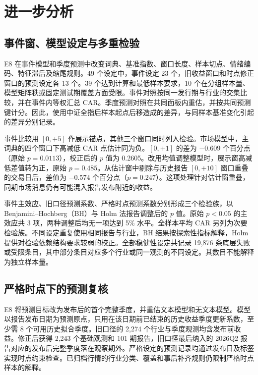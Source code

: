 \section{进一步分析}\label{sec:further}

\subsection{事件窗、模型设定与多重检验}

E8 在事件模型和季度预测中改变词典、基准指数、窗口长度、样本切点、情绪编码、特征滞后及缩尾规则。49 个设定中，事件设定 23 个，旧收益窗口和时点修正窗口的预测设定各 13 个。39 个达到计算和最低样本要求，10 个在分组样本量、模型矩阵秩或固定测试期覆盖方面受限。事件对照按同一发行期与行业的交集比较，并在事件内等权汇总 CAR。季度预测对照在共同面板内重估，并按共同预测键计分。因此，使用中证全指后样本起点后移造成的差异，与同样本基准变化引起的差异分别记录。

事件比较用 $[0,+5]$ 作展示锚点，其他三个窗口同时列入检验。市场模型中，主词典的四个窗口下高减低 CAR 点估计同为负。$[0,+1]$ 的差为 $-0.609$ 个百分点（原始 $p=0.0113$），校正后的 $p$ 值为 0.2605。改用均值调整模型时，展示窗高减低差值转为正，原始 $p=0.485$。从估计窗中剔除与历史报告 $[0,+10]$ 窗口重叠的交易日后，差值为 $-0.574$ 个百分点（$p=0.247$）。这项处理针对估计窗重叠，同期市场消息仍有可能混入报告发布附近的收益。

事件主效应、旧口径预测系数、严格时点预测系数分别形成三个检验族，以 Benjamini--Hochberg（BH）与 Holm 法报告调整后的 $p$ 值\cite{benjaminiHochberg1995,holm1979}。原始 $p<0.05$ 的主效应共 3 项，两种调整后均无一项达到 5\% 水平。全样本平均 CAR 另列为次要检验族。不同设定重复使用相同报告与行业，BH 结果按探索性指标解释，Holm 提供对检验依赖结构要求较弱的校正。全部稳健性设定共记录 19,876 条底层失败或受限条目，其中部分条目对应多个行业或同一观测的不同设定。其数目不能解释为独立样本量。

\subsection{严格时点下的预测复核}\label{sec:strict-timing}

E8 将预测目标改为发布后的首个完整季度，并重估文本模型和无文本模型。模型以报告发布日期为预测原点，只用在该日期前已结束的历史收益季度更新系数，至少需 8 个可用历史拟合季度。旧口径的 2,274 个行业与季度观测均含发布前收益。修正后获得 2,243 个基础观测和 101 期报告，旧口径最后纳入的 2026Q2 报告对应的发布后完整季度落在观察期外。严格设定的预测记录均通过发布日及标签实现时点约束检查。已归档行情的行业分类、覆盖和事后补齐规则仍限制严格时点样本的解释。

